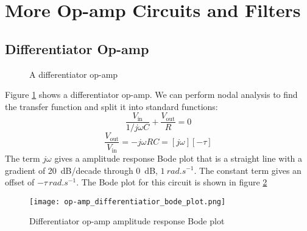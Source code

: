 \documentclass{article}
\begin{document}
    \section{More Op-amp Circuits and Filters}
    \subsection{Differentiator Op-amp}
    \begin{figure}[ht]
        \centering
        \caption{A differentiator op-amp}
        \label{fig:differentiator op-amp}
    \end{figure}
    Figure \ref{fig:differentiator op-amp} shows a differentiator op-amp.
    We can perform nodal analysis to find the transfer function and split it into standard functions:
    \[\frac{V_\text{in}}{1/j\omega C} + \frac{V_\text{out}}{R} = 0\]
    \[\frac{V_\text{out}}{V_\text{in}} = -j\omega RC = [j\omega][-\tau]\]
    The term \(j\omega\) gives a amplitude response Bode plot that is a straight line with a gradient of \SI{20}{dB}/decade through \SI{0}{dB}, \(\SI{1}{rad.s^{-1}}\).
    The constant term gives an offset of \(-\tau\,\si{rad.s^{-1}}\).
    The Bode plot for this circuit is shown in figure \ref{fig:differentiator op-amp bode plot}
    \begin{figure}[ht]
        \centering
        \texttt{[image: op-amp\_differentiatior\_bode\_plot.png]}
        \caption{Differentiator op-amp amplitude response Bode plot}
        \label{fig:differentiator op-amp bode plot}
    \end{figure}
    
\end{document}
